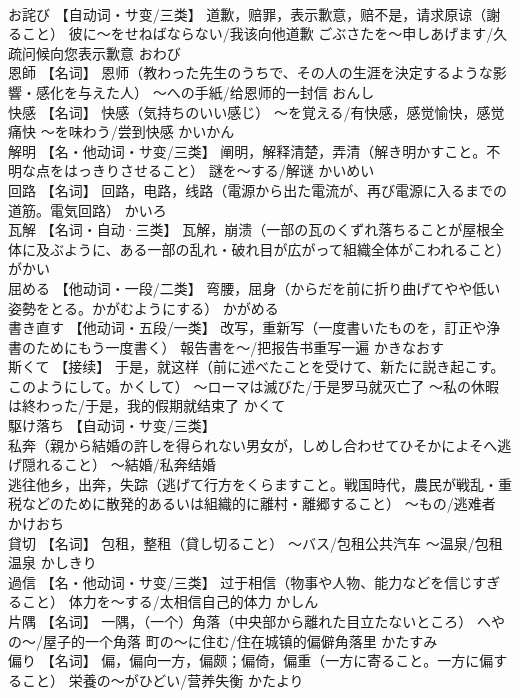 \documentclass[8pt]{extreport}
\begin{document}
\begin{CJK}{UTF8}{min}
\\	お詫び	【自动词・サ变/三类】 道歉，赔罪，表示歉意，赔不是，请求原谅（謝ること） 彼に～をせねばならない/我该向他道歉 ごぶさたを～申しあげます/久疏问候向您表示歉意	おわび	
\\	恩師	【名词】 恩师（教わった先生のうちで、その人の生涯を決定するような影響・感化を与えた人） ～への手紙/给恩师的一封信	おんし	
\\	快感	【名词】 快感（気持ちのいい感じ） ～を覚える/有快感，感觉愉快，感觉痛快 ～を味わう/尝到快感	かいかん	
\\	解明	【名・他动词・サ变/三类】 阐明，解释清楚，弄清（解き明かすこと。不明な点をはっきりさせること） 謎を～する/解谜	かいめい	
\\	回路	【名词】 回路，电路，线路（電源から出た電流が、再び電源に入るまでの道筋。電気回路）	かいろ	
\\	瓦解	【名词・自动·三类】 瓦解，崩溃（一部の瓦のくずれ落ちることが屋根全体に及ぶように、ある一部の乱れ・破れ目が広がって組織全体がこわれること）	がかい	
\\	屈める	【他动词・一段/二类】 弯腰，屈身（からだを前に折り曲げてやや低い姿勢をとる。かがむようにする）	かがめる	
\\	書き直す	【他动词・五段/一类】 改写，重新写（一度書いたものを，訂正や浄書のためにもう一度書く） 報告書を～/把报告书重写一遍	かきなおす	
\\	斯くて	【接续】 于是，就这样（前に述べたことを受けて、新たに説き起こす。このようにして。かくして） ～ローマは滅びた/于是罗马就灭亡了 ～私の休暇は終わった/于是，我的假期就结束了	かくて	
\\	駆け落ち	【自动词・サ变/三类】 
\\	私奔（親から結婚の許しを得られない男女が，しめし合わせてひそかによそへ逃げ隠れること） ～結婚/私奔结婚 
\\	逃往他乡，出奔，失踪（逃げて行方をくらますこと。戦国時代，農民が戦乱・重税などのために散発的あるいは組織的に離村・離郷すること） ～もの/逃难者	かけおち	
\\	貸切	【名词】 包租，整租（貸し切ること） ～バス/包租公共汽车 ～温泉/包租温泉	かしきり	
\\	過信	【名・他动词・サ变/三类】 过于相信（物事や人物、能力などを信じすぎること） 体力を～する/太相信自己的体力	かしん	
\\	片隅	【名词】 一隅，（一个）角落（中央部から離れた目立たないところ） へやの～/屋子的一个角落 町の～に住む/住在城镇的偏僻角落里	かたすみ	
\\	偏り	【名词】 偏，偏向一方，偏颇；偏倚，偏重（一方に寄ること。一方に偏すること） 栄養の～がひどい/营养失衡	かたより	

\end{CJK}
\end{document}
